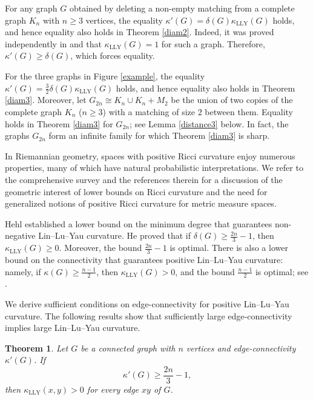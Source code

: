 \documentclass[11pt,bezier]{article}
\newtheorem{theorem}{Theorem}[section]
\theoremstyle{definition}
\theoremstyle{definition}
\theoremstyle{nonumber}
\begin{document}
For any graph $G$ obtained by deleting a non-empty matching from a complete graph $K_n$ with $n \geq 3$ vertices, the equality $\kappa'(G) = \delta(G)  \kappa_{\mathrm{LLY}}(G)$ holds, and hence equality also holds in Theorem \ref{diam2}. 
Indeed, it was proved independently in \cite[Theorem 1.3]{Cushing} and \cite[Theorem 1]{Huang} that $\kappa_{\mathrm{LLY}}(G) = 1$ for such a graph. Therefore, $\kappa'(G) \geq \delta(G)$, which forces equality.

For the three graphs in Figure \ref{example}, the equality $\kappa'(G) = \frac{3}{2}\delta(G)  \kappa_{\mathrm{LLY}}(G)$ holds, and hence equality also holds in Theorem \ref{diam3}.
Moreover, let $G_{2n}\cong K_n \cup K_n +M_2$ be the union of two copies of the complete graph $K_n$ ($n\geq3$) with a matching of size 2 between them. Equality holds in Theorem \ref{diam3} for $G_{2n}$; see Lemma \ref{distance3} below.  
In fact, the graphs $G_{2n}$ form an infinite family for which Theorem \ref{diam3} is sharp.

In Riemannian geometry, spaces with positive Ricci curvature enjoy numerous properties, many of which have natural probabilistic interpretations.
We refer to the comprehensive survey \cite{Lott} and the references therein for a discussion of the geometric interest of lower bounds on Ricci curvature and the need for generalized notions of positive Ricci curvature for metric measure spaces.

Hehl \cite{Hehlmin} established a lower bound on the minimum degree that guarantees non-negative Lin--Lu--Yau curvature. He proved that if $\delta(G)\geq \frac{2n}{3}-1$, then $\kappa_{\mathrm{LLY}}(G)\geq0$. Moreover, the bound $\frac{2n}{3}-1$ is optimal.
There is also a lower bound on the connectivity that guarantees positive Lin--Lu--Yau curvature: namely, if $\kappa(G)\geq \frac{n-1}{2}$, then $\kappa_{\mathrm{LLY}}(G)>0$, and the bound $\frac{n-1}{2}$ is optimal; see \cite[Theorem 1.7 and Theorem 1.8]{Liu}.

We derive sufficient conditions on edge-connectivity for positive Lin--Lu--Yau curvature.
The following results show that sufficiently large edge-connectivity implies large Lin--Lu--Yau curvature.

\begin{theorem}\label{n bound}
Let $G$ be a connected graph with $n$ vertices and edge-connectivity $\kappa'(G)$. If 
$$
\kappa'(G)\ge \frac{2n}{3}-1,
$$ 
then $\kappa_{\mathrm{LLY}}(x,y)>0$ for every edge $xy$ of $G$.
\end{theorem}
\end{document}
